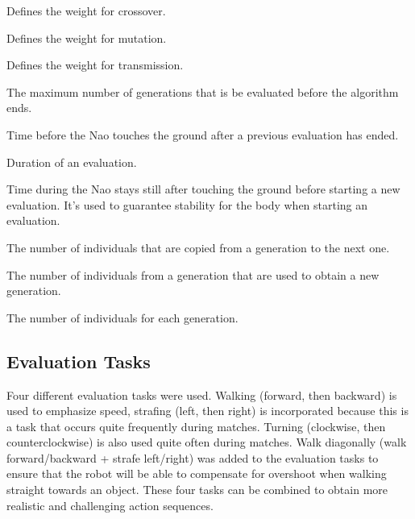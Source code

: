 \documentclass{article}
\begin{document}
\begin{description}
\setlength{\itemsep}{-2pt}
\item[Crossover rate] Defines the weight for crossover.
\item[Mutation rate] Defines the weight for mutation.
\item[Transmission rate] Defines the weight for transmission.
\item[maxGeneration] The maximum number of generations that is be evaluated before the algorithm ends. 

\item[ResettingTime] Time before the Nao touches the ground after a previous evaluation has ended.
\item[RunningTime] Duration of an evaluation.
\item[StandingTime] Time during the Nao stays still after touching the ground before starting a new evaluation. It's used to guarantee stability for the body when starting an evaluation.
\item[\# Survivors] The number of individuals that are copied from a generation to the next one. 
\item[\# Parents] The number of individuals from a generation that are used to obtain a new generation.
\item[PopulationSize] The number of individuals for each generation.

\end{description}

\subsection{Evaluation Tasks}

Four different evaluation tasks were used. Walking (forward, then backward) is used to emphasize speed, strafing (left, then right) is incorporated because this is a task that occurs quite frequently during matches. Turning (clockwise, then counterclockwise) is also used quite often during matches. Walk diagonally (walk forward/backward + strafe left/right) was added to the evaluation tasks to ensure that the robot will be able to compensate for overshoot when walking straight towards an object. These four tasks can be combined to obtain more realistic and challenging action sequences.

\end{document}
